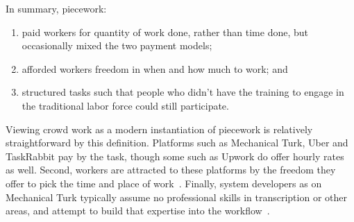 \documentclass[trackingWork]{subfiles}
\begin{document}
In summary, piecework:
\begin{enumerate}
  \item paid workers for quantity of work done, rather than time done,
        but occasionally mixed the two payment models;
  \item afforded workers freedom in when and how much to work; and
  \item structured tasks such that people who didn't have the training
        to engage in the traditional labor force could still participate.
\end{enumerate}

Viewing crowd work as a modern instantiation of piecework is relatively straightforward by this definition. 
Platforms such as Mechanical Turk, Uber and TaskRabbit pay by the task, though some such as Upwork do offer hourly rates as well. 
Second, workers are attracted to these platforms by the freedom they offer to pick the time and place of work~\cite{martin2014being,whyWouldAnyoneBrewer}.
Finally, system developers as on Mechanical Turk typically assume no professional skills in transcription or other areas, and attempt to build that expertise into the workflow~\cite{noronha2011platemate,bernsteinSoylent}.
\end{document}
